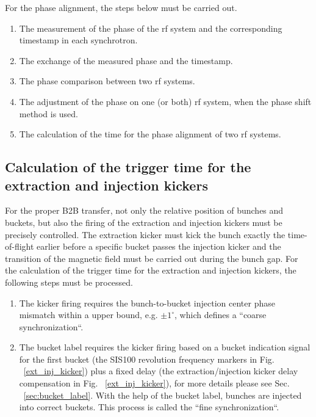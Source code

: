 For the phase alignment, the steps below must be carried out. 
\begin{enumerate}
\item The measurement of the phase of the rf system and the corresponding timestamp in each synchrotron.
\item The exchange of the measured phase and the timestamp.
\item The phase comparison between two rf systems.
\item The adjustment of the phase on one (or both) rf system, when the phase shift method is used. 
\item The calculation of the time for the phase alignment of two rf systems.
\end{enumerate}

\subsection{Calculation of the trigger time for the extraction and injection kickers}
\label{sec:compensation}
For the proper B2B transfer, not only the relative position of bunches and buckets, but also the firing of the extraction and injection kickers must be precisely controlled. The extraction kicker must kick the bunch exactly the time-of-flight earlier before a specific bucket passes the injection kicker and the transition of the magnetic field must be carried out during the bunch gap. For the calculation of the trigger time for the extraction and injection kickers, the following steps must be processed. 
\begin{enumerate}
\item The kicker firing requires the bunch-to-bucket injection center phase mismatch within a upper bound, e.g. $\pm 1^\circ$, which defines a ``coarse synchronization``.
\item The bucket label requires the kicker firing based on a bucket indication signal for the first bucket (the SIS100 revolution frequency markers in Fig. ~\ref{ext_inj_kicker}) plus a
fixed delay (the extraction/injection kicker delay compensation in Fig. ~\ref{ext_inj_kicker}), for more details please see Sec. ~\ref{sec:bucket_label}. With the help of the bucket label, bunches are injected into correct buckets. This process is called the ``fine synchronization``.
\end{enumerate}

